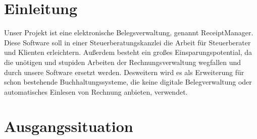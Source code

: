 \documentclass[12pt]{article}
\theoremstyle{definition}
\begin{document}
\section{Einleitung}

Unser Projekt ist eine elektronische Belegsverwaltung, genannt ReceiptManager. Diese Software soll in einer Steuerberatungskanzlei die Arbeit für Steuerberater und Klienten erleichtern. Außerdem besteht ein großes Einsparungspotential, da die unötigen und stupiden Arbeiten der Rechnungsverwaltung wegfallen und durch unsere Software ersetzt werden. Desweitern wird es als Erweiterung für schon bestehende Buchhaltungssysteme, die keine digitale Belegverwaltung oder automatisches Einlesen von Rechnung anbieten, verwendet.
\pagebreak

\section{Ausgangssituation}
\end{document}
